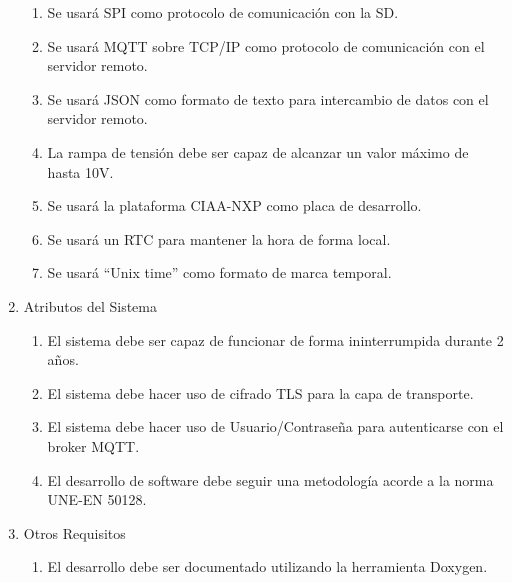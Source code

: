 \documentclass[11pt]{charter}
\begin{document}
\begin{enumerate}
\begin{enumerate}
	\item Se usará SPI como protocolo de comunicación con la SD.
	\item Se usará MQTT sobre TCP/IP como protocolo de comunicación con el servidor remoto.
	\item Se usará JSON como formato de texto para intercambio de datos con el servidor remoto.
	\item La rampa de tensión debe ser capaz de alcanzar un valor máximo de hasta 10V.
	\item Se usará la plataforma CIAA-NXP como placa de desarrollo.
	\item Se usará un RTC para mantener la hora de forma local.
	\item Se usará ``Unix time'' como formato de marca temporal. 
	\end{enumerate}
\item Atributos del Sistema
	\begin{enumerate}
	\item El sistema debe ser capaz de funcionar de forma ininterrumpida durante 2 años.
	\item El sistema debe hacer uso de cifrado TLS para la capa de transporte.
	\item El sistema debe hacer uso de Usuario/Contraseña para autenticarse con el broker MQTT.
	\item El desarrollo de software debe seguir una metodología acorde a la norma UNE-EN 50128.
	\end{enumerate}
\item Otros Requisitos
	\begin{enumerate}
	\item El desarrollo debe ser documentado utilizando la herramienta Doxygen.
	\end{enumerate}
\end{enumerate}
\end{document}
